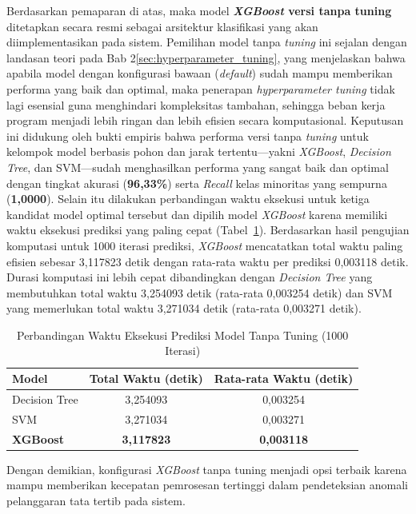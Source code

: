 Berdasarkan pemaparan di atas, maka model \textbf{\textit{XGBoost} versi tanpa tuning} ditetapkan secara resmi sebagai arsitektur klasifikasi yang akan diimplementasikan pada sistem. Pemilihan model tanpa \textit{tuning} ini sejalan dengan landasan teori pada Bab 2\ref{sec:hyperparameter_tuning}, yang menjelaskan bahwa apabila model dengan konfigurasi bawaan (\textit{default}) sudah mampu memberikan performa yang baik dan optimal, maka penerapan \textit{hyperparameter tuning} tidak lagi esensial guna menghindari kompleksitas tambahan, sehingga beban kerja program menjadi lebih ringan dan lebih efisien secara komputasional. Keputusan ini didukung oleh bukti empiris bahwa performa versi tanpa {\it tuning} untuk kelompok model berbasis pohon dan jarak tertentu—yakni \textit{XGBoost}, \textit{Decision Tree}, dan SVM—sudah menghasilkan performa yang sangat baik dan optimal dengan tingkat akurasi (\textbf{96,33\%}) serta \textit{Recall} kelas minoritas yang sempurna (\textbf{1,0000}). Selain itu dilakukan perbandingan waktu eksekusi untuk ketiga kandidat model optimal tersebut dan dipilih model \textit{XGBoost} karena memiliki waktu eksekusi prediksi yang paling cepat (Tabel~\ref{tab:waktu_eksekusi}). Berdasarkan hasil pengujian komputasi untuk 1000 iterasi prediksi, \textit{XGBoost} mencatatkan total waktu paling efisien sebesar 3,117823 detik dengan rata-rata waktu per prediksi 0,003118 detik. Durasi komputasi ini lebih cepat dibandingkan dengan \textit{Decision Tree} yang membutuhkan total waktu 3,254093 detik (rata-rata 0,003254 detik) dan SVM yang memerlukan total waktu 3,271034 detik (rata-rata 0,003271 detik).

\begin{table}[H]
\centering
\caption{Perbandingan Waktu Eksekusi Prediksi Model Tanpa Tuning (1000 Iterasi)}
\label{tab:waktu_eksekusi}
\begin{tabular}{|l|c|c|}
\hline
\textbf{Model} & \textbf{Total Waktu (detik)} & \textbf{Rata-rata Waktu (detik)} \\
\hline
Decision Tree & 3,254093 & 0,003254 \\
\hline
SVM & 3,271034 & 0,003271 \\
\hline
\textbf{XGBoost} & \textbf{3,117823} & \textbf{0,003118} \\
\hline
\end{tabular}
\end{table}
Dengan demikian, konfigurasi \textit{XGBoost} tanpa tuning menjadi opsi terbaik karena mampu memberikan kecepatan pemrosesan tertinggi dalam pendeteksian anomali pelanggaran tata tertib pada sistem.